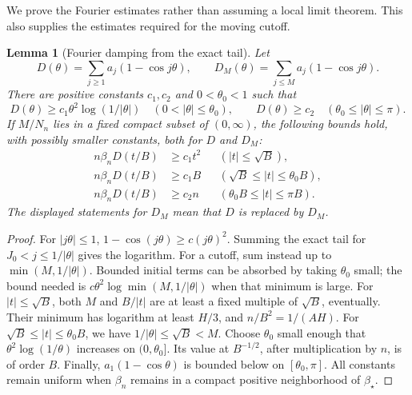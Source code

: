 \documentclass[11pt,a4paper]{article}
\numberwithin{equation}{section}
\newtheorem{lemma}[theorem]{Lemma}
\theoremstyle{definition}
\theoremstyle{remark}
\newcommand{\bs}{\beta_\star}
\begin{document}
We prove the Fourier estimates rather than assuming a local limit theorem.
This also supplies the estimates required for the moving cutoff.

\begin{lemma}[Fourier damping from the exact tail]
\label{lem:damping}
Let
\[
 D(\theta)=\sum_{j\ge1}a_j(1-\cos j\theta),\qquad
 D_M(\theta)=\sum_{j\le M}a_j(1-\cos j\theta).
\]
There are positive constants \(c_1,c_2\) and \(0<\theta_0<1\) such that
\[
 D(\theta)\ge c_1\theta^2\log(1/|\theta|)
 \quad(0<|\theta|\le\theta_0),\qquad
 D(\theta)\ge c_2\quad(\theta_0\le|\theta|\le\pi).
\]
If \(M/N_n\) lies in a fixed compact subset of \((0,\infty)\), the following
bounds hold, with possibly smaller constants, both for \(D\) and \(D_M\):
\begin{align*}
 n\beta_n D(t/B)&\ge c_1t^2 &&(|t|\le\sqrt B),\\
 n\beta_n D(t/B)&\ge c_1B &&(\sqrt B\le|t|\le\theta_0B),\\
 n\beta_n D(t/B)&\ge c_2n &&(\theta_0B\le|t|\le\pi B).
\end{align*}
The displayed statements for \(D_M\) mean that \(D\) is replaced by \(D_M\).
\end{lemma}
\begin{proof}
For \(|j\theta|\le1\), \(1-\cos(j\theta)\ge c(j\theta)^2\).
Summing the exact tail for \(J_0<j\le1/|\theta|\) gives the logarithm.
For a cutoff, sum instead up to \(\min(M,1/|\theta|)\). Bounded initial
terms can be absorbed by taking \(\theta_0\) small; the bound needed is
\(c\theta^2\log\min(M,1/|\theta|)\) when that minimum is large.
For \(|t|\le\sqrt B\), both \(M\) and \(B/|t|\) are at least a fixed
multiple of \(\sqrt B\), eventually. Their minimum has logarithm at least
\(H/3\), and \(n/B^2=1/(AH)\). For
\(\sqrt B\le|t|\le\theta_0 B\), we have \(1/|\theta|\le\sqrt B<M\).
Choose \(\theta_0\) small enough that
\(\theta^2\log(1/\theta)\) increases on \((0,\theta_0]\). Its value at
\(B^{-1/2}\), after multiplication by \(n\), is of order \(B\).
Finally, \(a_1(1-\cos\theta)\) is bounded below on
\([\theta_0,\pi]\). All constants remain uniform when \(\beta_n\) remains
in a compact positive neighborhood of \(\bs\).
\end{proof}
\end{document}
